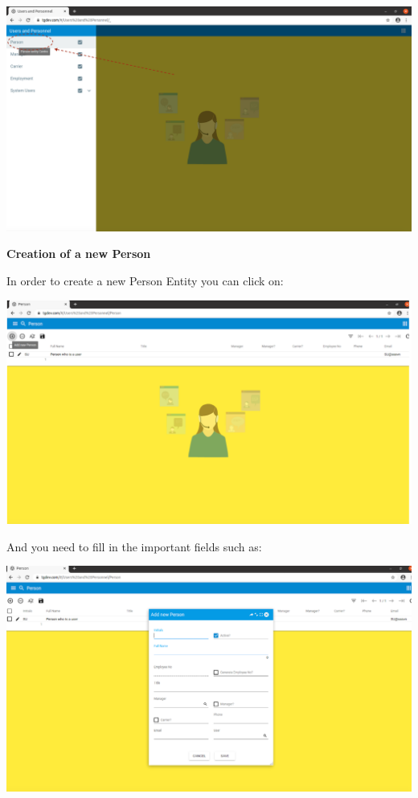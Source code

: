 \includegraphics[width=\textwidth]{sections/01-chapter/images/person11.png}

\textbf{Creation of a new Person}

In order to create a new Person Entity you can click on: 

\includegraphics[width=\textwidth]{sections/01-chapter/images/person2.png}

And you need to  fill in the important fields such as:

\includegraphics[width=\textwidth]{sections/01-chapter/images/person3.png}

